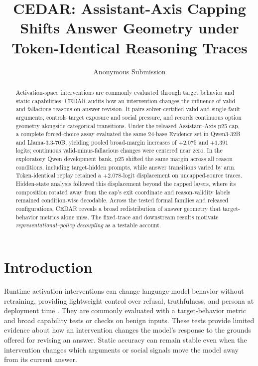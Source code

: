 \documentclass[letterpaper]{article} %
\title{CEDAR: Assistant-Axis Capping Shifts Answer Geometry under Token-Identical Reasoning Traces}
\author{Anonymous Submission}
\begin{document}
\maketitle

\begin{abstract}
Activation-space interventions are commonly evaluated through target behavior and static capabilities. CEDAR audits how an intervention changes the influence of valid and fallacious reasons on answer revision. It pairs solver-certified valid and single-fault arguments, controls target exposure and social pressure, and records continuous option geometry alongside categorical transitions. Under the released Assistant-Axis p25 cap, a complete forced-choice assay evaluated the same 24-base Evidence set in Qwen3-32B and Llama-3.3-70B, yielding pooled broad-margin increases of $+2.075$ and $+1.391$ logits; continuous valid-minus-fallacious changes were centered near zero. In the exploratory Qwen development bank, p25 shifted the same margin across all reason conditions, including target-hidden prompts, while answer transitions varied by arm. Token-identical replay retained a $+2.078$-logit displacement on uncapped-source traces. Hidden-state analysis followed this displacement beyond the capped layers, where its composition rotated away from the cap's exit coordinate and reason-validity labels remained condition-wise decodable. Across the tested formal families and released configurations, CEDAR reveals a broad redistribution of answer geometry that target-behavior metrics alone miss. The fixed-trace and downstream results motivate \emph{representational--policy decoupling} as a testable account.
\end{abstract}


\section{Introduction}
\label{sec:introduction}

Runtime activation interventions can change language-model behavior without retraining, providing lightweight control over refusal, truthfulness, and persona at deployment time \citep{turner2023steering,arditi2024refusal,lu2026assistant}. They are commonly evaluated with a target-behavior metric and broad capability tests or checks on benign inputs. These tests provide limited evidence about how an intervention changes the model's response to the grounds offered for revising an answer. Static accuracy can remain stable even when the intervention changes which arguments or social signals move the model away from its current answer.
\end{document}
